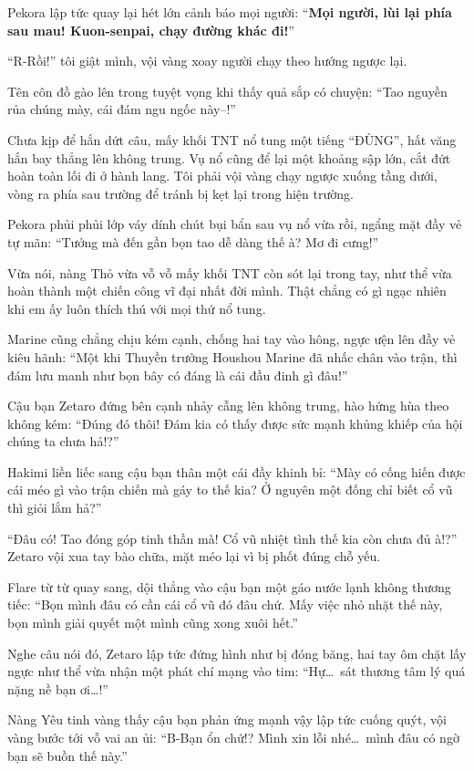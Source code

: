 \documentclass[../main.tex]{subfiles}
\begin{document}
Pekora lập tức quay lại hét lớn cảnh báo mọi người: ``\textbf{Mọi người, lùi lại phía sau mau! Kuon-senpai, chạy đường khác đi!}''

``R-Rồi!'' tôi giật mình, vội vàng xoay người chạy theo hướng ngược lại.

Tên côn đồ gào lên trong tuyệt vọng khi thấy quả sắp có chuyện: ``Tao nguyền rủa chúng mày, cái đám ngu ngốc này--!''

Chưa kịp để hắn dứt câu, mấy khối TNT nổ tung một tiếng ``ĐÙNG'', hất văng hắn bay thẳng lên không trung. Vụ nổ cũng để lại một khoảng sập lớn, cắt đứt hoàn toàn lối đi ở hành lang. Tôi phải vội vàng chạy ngược xuống tầng dưới, vòng ra phía sau trường để tránh bị kẹt lại trong hiện trường.

Pekora phủi phủi lớp váy dính chút bụi bẩn sau vụ nổ vừa rồi, ngẩng mặt đầy vẻ tự mãn: ``Tưởng mà đến gần bọn tao dễ dàng thế à? Mơ đi cưng!''

Vừa nói, nàng Thỏ vừa vỗ vỗ mấy khối TNT còn sót lại trong tay, như thể vừa hoàn thành một chiến công vĩ đại nhất đời mình. Thật chẳng có gì ngạc nhiên khi em ấy luôn thích thú với mọi thứ nổ tung.

Marine cũng chẳng chịu kém cạnh, chống hai tay vào hông, ngực ưện lên đầy vẻ kiêu hãnh: ``Một khi Thuyền trưởng Houshou Marine đã nhấc chân vào trận, thì đám lưu manh như bọn bây có đáng là cái đầu đinh gì đâu!''

Cậu bạn Zetaro đứng bên cạnh nhảy cẫng lên không trung, hào hứng hùa theo không kém: ``Đúng đó thôi! Đám kia có thấy được sức mạnh khủng khiếp của hội chúng ta chưa hả!?''

Hakimi liền liếc sang cậu bạn thân một cái đầy khinh bỉ: ``Mày có cống hiến được cái méo gì vào trận chiến mà gáy to thế kia? Ở nguyên một đống chỉ biết cổ vũ thì giỏi lắm hả?''

``Đâu có! Tao đóng góp tinh thần mà! Cổ vũ nhiệt tình thế kia còn chưa đủ à!?'' Zetaro vội xua tay bào chữa, mặt méo lại vì bị phốt đúng chỗ yếu.

Flare từ từ quay sang, dội thẳng vào cậu bạn một gáo nước lạnh không thương tiếc: ``Bọn mình đâu có cần cái cổ vũ đó đâu chứ. Mấy việc nhỏ nhặt thế này, bọn mình giải quyết một mình cũng xong xuôi hết.''

Nghe câu nói đó, Zetaro lập tức đứng hình như bị đóng băng, hai tay ôm chặt lấy ngực như thể vừa nhận một phát chí mạng vào tim: ``Hự\dots\ sát thương tâm lý quá nặng nề bạn ơi\dots!''

Nàng Yêu tinh vàng thấy cậu bạn phản ứng mạnh vậy lập tức cuống quýt, vội vàng bước tới vỗ vai an ủi: ``B-Bạn ổn chứ!? Mình xin lỗi nhé\dots\ mình đâu có ngờ bạn sẽ buồn thế này.''
\end{document}
